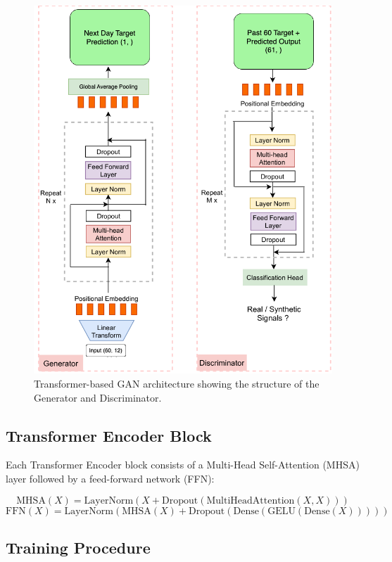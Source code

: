 \begin{figure}[h!]
    \centering
    \includegraphics[width=\textwidth]{Images/TimeGAN.png}
    \caption{Transformer-based GAN architecture showing the structure of the Generator and Discriminator.}
    \label{fig:transformer_gan_architecture}
\end{figure}

\subsection{Transformer Encoder Block}

\begingroup
\sloppy
Each Transformer Encoder block consists of a Multi-Head Self-Attention (MHSA) layer followed by a feed-forward network (FFN):
\endgroup

\[
\text{MHSA}(X) = \text{LayerNorm}(X + \text{Dropout}(\text{MultiHeadAttention}(X, X)))
\]
\[
\text{FFN}(X) = \text{LayerNorm}(\text{MHSA}(X) + \text{Dropout}(\text{Dense}(\text{GELU}(\text{Dense}(X)))))
\]

\subsection{Training Procedure}

